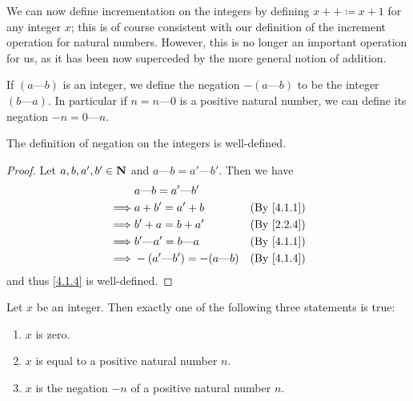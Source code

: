 \begin{note}
  We can now define incrementation on the integers by defining \(x++ \coloneqq x + 1\) for any integer \(x\);
  this is of course consistent with our definition of the increment operation for natural numbers.
  However, this is no longer an important operation for us, as it has been now superceded by the more general notion of addition.
\end{note}

\begin{definition}\label{4.1.4}
  If \((a \text{---} b)\) is an integer, we define the negation \(-(a \text{---} b)\) to be the integer \((b \text{---} a)\).
  In particular if \(n = n \text{---} 0\) is a positive natural number, we can define its negation \(-n = 0 \text{---} n\).
\end{definition}

\begin{additional corollary}\label{ac 4.1.2}
The definition of negation on the integers is well-defined.
\end{additional corollary}

\begin{proof}
  Let \(a, b, a', b' \in \mathbf{N}\) and \(a \text{---} b = a' \text{---} b'\).
  Then we have
  \begin{align*}
             & a \text{---} b = a' \text{---} b'                                  \\
    \implies & a + b' = a' + b                         & \text{(By \cref{4.1.1})} \\
    \implies & b' + a = b + a'                         & \text{(By \cref{2.2.4})} \\
    \implies & b' \text{---} a' = b \text{---} a       & \text{(By \cref{4.1.1})} \\
    \implies & -(a' \text{---} b') = -(a \text{---} b) & \text{(By \cref{4.1.4})} \\
  \end{align*}
  and thus \cref{4.1.4} is well-defined.
\end{proof}

\begin{lemma}\label{4.1.5}
  Let \(x\) be an integer.
  Then exactly one of the following three statements is true:
  \begin{enumerate}
    \item \(x\) is zero.
    \item \(x\) is equal to a positive natural number \(n\).
    \item \(x\) is the negation \(-n\) of a positive natural number \(n\).
  \end{enumerate}
\end{lemma}

